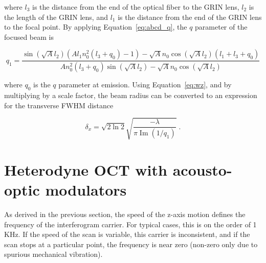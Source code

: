 \noindent where $l_3$ is the distance from the end of the optical fiber to the GRIN lens, $l_2$ is the length of the GRIN lens, and $l_1$ is the distance from the end of the GRIN lens to the focal point. By applying Equation~\ref{eq:abcd_q}, the $q$ parameter of the focused beam is

\begin{equation}
q_1 = \frac{\sin (\sqrt{A} l_2) (A l_1 n_0^2
   (l_3+q_0)-1)-\sqrt{A} n_0 \cos (\sqrt{A}
   l_2) (l_1+l_3+q_0)}{A n_0^2 (l_3+q_0) \sin
   (\sqrt{A} l_2)-\sqrt{A} n_0 \cos (\sqrt{A}
   l_2)}
   \label{eq:q1}
\end{equation}

\noindent where $q_0$ is the $q$ parameter at emission. Using Equation~\ref{eq:wz}, and by multiplying by a scale factor, the beam radius can be converted to an expression for the transverse FWHM distance

\begin{equation}
\delta_x = \sqrt{2 \ln{2}} \sqrt{\frac{-\lambda}{\pi \operatorname{Im} (1/q_1)}}  \; .
\end{equation} 




\section{Heterodyne OCT with acousto-optic modulators}

As derived in the previous section, the speed of the z-axis motion defines the frequency of the interferogram carrier. For typical cases, this is on the order of 1 KHz. If the speed of the scan is variable, this carrier is inconsistent, and if the scan stops at a particular point, the frequency is near zero (non-zero only due to spurious mechanical vibration).

